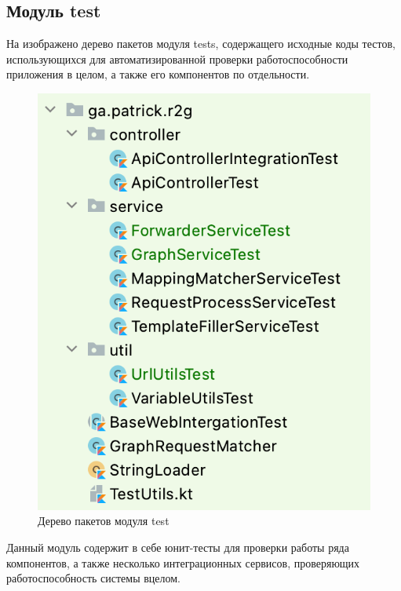 \subsection{Модуль test}\label{subsec:module-test}

На  изображено дерево пакетов модуля tests, содержащего исходные коды тестов, использующихся для автоматизированной проверки работоспособности приложения в целом, а также его компонентов по отдельности.

\begin{figure}[ht!]
	\center
	\includegraphics [scale=0.6] {my_folder/images/ch3-tests}
	\caption{Дерево пакетов модуля test}
	\label{fig:ch3-tests}
\end{figure}



Данный модуль содержит в себе юнит-тесты для проверки работы ряда компонентов, а также несколько интеграционных сервисов, проверяющих работоспособность системы вцелом.

